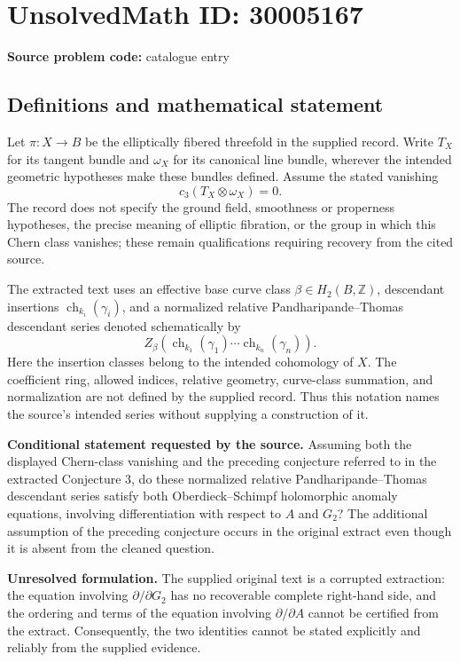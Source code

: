 \documentclass[11pt]{article}
\newcommand{\Z}{\mathbb{Z}}
\begin{document}
\section*{UnsolvedMath ID: 30005167}
\textbf{Source problem code:} catalogue entry
\subsection{Definitions and mathematical statement}
Let \(\pi\colon X\to B\) be the elliptically fibered threefold in the supplied record. Write \(T_X\) for its tangent bundle and \(\omega_X\) for its canonical line bundle, wherever the intended geometric hypotheses make these bundles defined. Assume the stated vanishing
\[
 c_3(T_X\otimes\omega_X)=0.
\]
The record does not specify the ground field, smoothness or properness hypotheses, the precise meaning of elliptic fibration, or the group in which this Chern class vanishes; these remain qualifications requiring recovery from the cited source.

The extracted text uses an effective base curve class \(\beta\in H_2(B,\Z)\), descendant insertions \(\operatorname{ch}_{k_i}(\gamma_i)\), and a normalized relative Pandharipande--Thomas descendant series denoted schematically by
\[
 Z_\beta\!\left(\operatorname{ch}_{k_1}(\gamma_1)\cdots
 \operatorname{ch}_{k_n}(\gamma_n)\right).
\]
Here the insertion classes belong to the intended cohomology of \(X\). The coefficient ring, allowed indices, relative geometry, curve-class summation, and normalization are not defined by the supplied record. Thus this notation names the source's intended series without supplying a construction of it.

\textbf{Conditional statement requested by the source.} Assuming both the displayed Chern-class vanishing and the preceding conjecture referred to in the extracted Conjecture 3, do these normalized relative Pandharipande--Thomas descendant series satisfy both Oberdieck--Schimpf holomorphic anomaly equations, involving differentiation with respect to \(A\) and \(G_2\)? The additional assumption of the preceding conjecture occurs in the original extract even though it is absent from the cleaned question.

\textbf{Unresolved formulation.} The supplied original text is a corrupted extraction: the equation involving \(\partial/\partial G_2\) has no recoverable complete right-hand side, and the ordering and terms of the equation involving \(\partial/\partial A\) cannot be certified from the extract. Consequently, the two identities cannot be stated explicitly and reliably from the supplied evidence.
\end{document}
